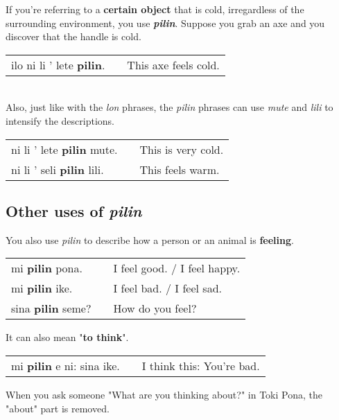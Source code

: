 If you're referring to a \textbf{certain object} that is cold, irregardless of the surrounding environment, you use \textbf{\textit{pilin}}.  
Suppose you grab an axe and you discover that the handle is cold. 

\begin{supertabular}{p{5,5cm}|ll}
ilo ni li ' lete \textbf{pilin}. && This axe feels cold. \\
\end{supertabular} \\

Also, just like with the \textit{lon} phrases, the \textit{pilin} phrases can use \textit{mute} and \textit{lili} to intensify the descriptions. 

\begin{supertabular}{p{5,5cm}|ll}
ni li ' lete \textbf{pilin} mute. && This is very cold. \\
ni li ' seli \textbf{pilin} lili. && This feels warm. \\
\end{supertabular} 
%
\subsection*{Other uses of \textit{pilin}}
%
You also use \textit{pilin} to describe how a person or an animal is \textbf{feeling}. 

\begin{supertabular}{p{5,5cm}|ll}
mi \textbf{pilin} pona. && I feel good. / I feel happy. \\
mi \textbf{pilin} ike. && I feel bad. / I feel sad. \\
sina \textbf{pilin} seme? && How do you feel? \\ 
\end{supertabular} 

It can also mean "\textbf{to think}".

\begin{supertabular}{p{5,5cm}|ll}
mi \textbf{pilin} e ni: sina ike. && I think this: You're bad. \\ 
\end{supertabular} 

When you ask someone "What are you thinking about?" in Toki Pona, the "about" part is removed. 

